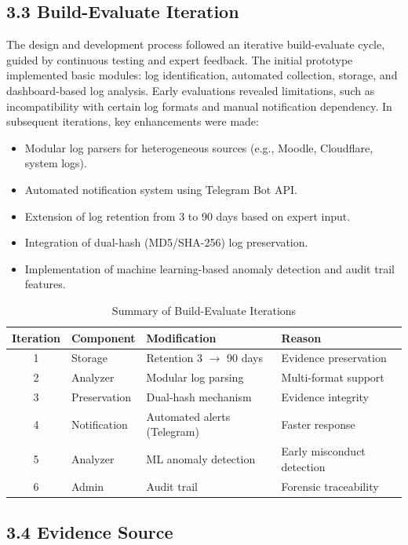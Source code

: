 \subsection{3.3 Build-Evaluate Iteration}

The design and development process followed an iterative build-evaluate cycle, guided by continuous testing and expert feedback. The initial prototype implemented basic modules: log identification, automated collection, storage, and dashboard-based log analysis. Early evaluations revealed limitations, such as incompatibility with certain log formats and manual notification dependency. In subsequent iterations, key enhancements were made:
\begin{itemize}
	\item Modular log parsers for heterogeneous sources (e.g., Moodle, Cloudflare, system logs).
	\item Automated notification system using Telegram Bot API.
	\item Extension of log retention from 3 to 90 days based on expert input.
	\item Integration of dual-hash (MD5/SHA-256) log preservation.
	\item Implementation of machine learning-based anomaly detection and audit trail features.
\end{itemize}

\begin{table}[ht]
	\caption{Summary of Build-Evaluate Iterations}
	\centering
	\begin{tabular}{|c|l|l|l|}
		\hline
		\textbf{Iteration} & \textbf{Component} & \textbf{Modification} & \textbf{Reason} \\ \hline
		1 & Storage & Retention 3 $\rightarrow$ 90 days & Evidence preservation \\
		2 & Analyzer & Modular log parsing & Multi-format support \\
		3 & Preservation & Dual-hash mechanism & Evidence integrity \\
		4 & Notification & Automated alerts (Telegram) & Faster response \\
		5 & Analyzer & ML anomaly detection & Early misconduct detection \\
		6 & Admin & Audit trail & Forensic traceability \\
		\hline
	\end{tabular}
	\label{tab:build_eval}
\end{table}

\subsection{3.4 Evidence Source}

